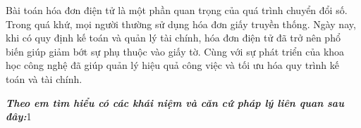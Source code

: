 
Bài toán hóa đơn điện tử là một phần quan trọng của quá trình chuyển đổi số. Trong quá khứ, mọi người thường sử dụng hóa đơn giấy truyền thống. Ngày nay, khi có quy định kế toán và quản lý tài chính, hóa đơn điện tử đã trở nên phổ biến giúp giảm bớt sự phụ thuộc vào giấy tờ. Cùng với sự phát triển của khoa học công nghệ đã giúp quản lý hiệu quả công việc và tối ưu hóa quy trình kế toán và tài chính.

\textbf{\textit{Theo em tìm hiểu có các khái niệm và căn cứ pháp lý liên quan sau đây:}}1
